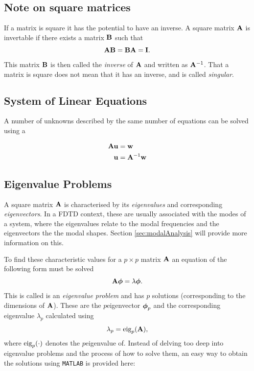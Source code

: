 \subsection{Note on square matrices}
If a matrix is square it has the potential to have an inverse. A square matrix $\mathbf{A}$ is invertable if there exists a matrix $\mathbf{B}$ such that
\begin{equation}
    \mathbf{A} \mathbf{B} = \mathbf{B} \mathbf{A} = \mathbf{I}. 
\end{equation}
This matrix $\mathbf{B}$ is then called the \textit{inverse} of $\mathbf{A}$ and written as $\mathbf{A}^{-1}$.
That a matrix is square does not mean that it has an inverse, and is called \textit{singular}. 


\subsection{System of Linear Equations}\label{sec:linearEquations}
A number of unknowns described by the same number of equations can be solved using a 

\begin{align*}
    \mathbf{A} \mathbf{u} &= \mathbf{w}\\
    \mathbf{u} &= \mathbf{A}^{-1}\mathbf{w}
\end{align*}

\subsection{Eigenvalue Problems}\label{sec:eigenValueProblems}
A square matrix $\mathbf{A}$ is characterised by its \textit{eigenvalues} and corresponding \textit{eigenvectors}. In a FDTD context, these are usually associated with the modes of a system, where the eigenvalues relate to the modal frequencies and  the eigenvectors the the modal shapes. Section \ref{sec:modalAnalysis} will provide more information on this.

To find these characteristic values for a $p\times p$ matrix $\mathbf{A}$ an equation of the following form must be solved 
\begin{equation}
    \mathbf{A} \boldsymbol{\phi} = \lambda \boldsymbol{\phi}.
\end{equation}
This is called is an \textit{eigenvalue problem} and has $p$ solutions (corresponding to the dimensions of $\mathbf{A}$). These are the $p$\th eigenvector $\boldsymbol{\phi}_p$ and the corresponding eigenvalue $\lambda_p$ calculated using
\begin{equation}
    \lambda_p = \text{eig}_p(\mathbf{A}),
\end{equation}
where $\text{eig}_p(\cdot)$ denotes the $p$\th eigenvalue of. Instead of delving too deep into eigenvalue problems and the process of how to solve them, an easy way to obtain the solutions using \texttt{MATLAB} is provided here:

